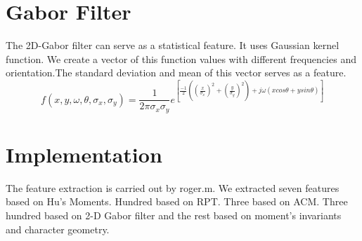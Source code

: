 \section{Gabor Filter}
The 2D-Gabor filter can serve as a statistical feature. It uses Gaussian kernel function.
We create a vector of this function values with 
different frequencies and orientation.The standard deviation and mean of this vector serves as a 
feature.
  \begin{equation}
f(x,y,\omega,\theta,\sigma_x,\sigma_y) = \frac{1}{2\pi\sigma_x\sigma_y}e^
{[\frac{-1}{2}((\frac{x}{\sigma_x})^2+(\frac{y}{\sigma_y})^2) + j\omega(xcos\theta +ysin\theta)]}
  \end{equation}
\section{Implementation}
The feature extraction is carried out by roger.m. We extracted  seven features based on Hu's Moments.
Hundred based on RPT. Three based on ACM. Three  hundred based on 2-D Gabor filter and the rest based on moment's invariants and character geometry.